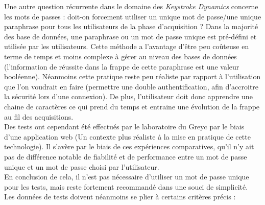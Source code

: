 Une autre question récurrente dans le domaine des \textit{Keystroke Dynamics} concerne les mots de passes : doit-on forcement utiliser un unique mot de passe/une unique paraphrase pour tous les utilisateurs de la phase d'acquisition ? Dans la majorité des base de données, une paraphrase ou un mot de passe unique est pré-défini et utilisée par les utilisateurs. Cette méthode a l'avantage d'être peu coûteuse en terme de temps et moins complexe à gérer au niveau des bases de données (l'information de réussite dans la frappe de cette paraphrase est une valeur booléenne). Néanmoins cette pratique reste peu réaliste par rapport à l'utilisation que l'on voudrait en faire (permettre une double authentification, afin d'accroitre la sécurité lors d'une connexion). De plus, l'utilisateur doit donc apprendre une chaine de caractères ce qui prend du temps et entraine une évolution de la frappe au fil des acquisitions.\\

Des tests ont cependant été effectués par le laboratoire du Greyc\cite{giotWeb} par le biais d'une application web (Un contexte plus réaliste à la mise en pratique de cette technologie). Il s'avère par le biais de ces expériences comparatives, qu'il n'y ait pas de différence notable de fiabilité et de performance entre un mot de passe unique et un mot de passe choisi par l'utilisateur.\\

En conclusion de cela, il n'est pas nécessaire d'utiliser un mot de passe unique pour les tests, mais reste fortement recommandé dans une souci de simplicité.\\

Les données de tests doivent néanmoins se plier à certains critères précis :\\

